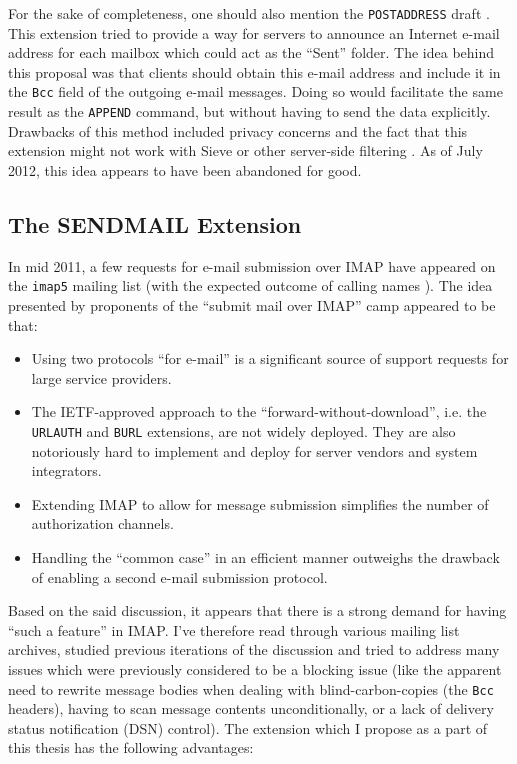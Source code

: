 \documentclass[trojita]{subfiles}
\begin{document}
For the sake of completeness, one should also mention the {\tt POSTADDRESS} draft
\cite{draft-melnikov-imap-postaddress}.  This extension tried to provide a way for servers to announce an Internet
e-mail address for each mailbox which could act as the ``Sent'' folder.  The idea behind this proposal was that clients
should obtain this e-mail address and include it in the {\tt Bcc} field of the outgoing e-mail messages.  Doing so would
facilitate the same result as the {\tt APPEND} command, but without having to send the data explicitly.  Drawbacks of
this method included privacy concerns and the fact that this extension might not work with Sieve or other server-side
filtering \cite{postaddress-sieve}.  As of July 2012, this idea appears to have been abandoned for good.

\subsection{The SENDMAIL Extension}

In mid 2011, a few requests for e-mail submission over IMAP have appeared on the {\tt imap5} mailing list
\cite{brong-imap5-list-of-ideas} (with the expected outcome of calling names \cite{crispin-brong-you-suck-useless}).
The idea presented by proponents of the ``submit mail over IMAP'' camp appeared to be that:

\begin{itemize}
  \item Using two protocols ``for e-mail'' is a significant source of support requests for large service providers.
  \item The IETF-approved approach to the ``forward-without-download'', i.e. the {\tt URLAUTH} and {\tt BURL}
    extensions, are not widely deployed.  They are also notoriously hard to implement and deploy for server vendors and
    system integrators.
  \item Extending IMAP to allow for message submission simplifies the number of authorization channels.
  \item Handling the ``common case'' in an efficient manner outweighs the drawback of enabling a second e-mail
    submission protocol.
\end{itemize}

Based on the said discussion, it appears that there is a strong demand for having ``such a feature'' in IMAP.  I've
therefore read through various mailing list archives, studied previous iterations of the discussion and tried to address
many issues which were previously considered to be a blocking issue (like the apparent need to rewrite message bodies
when dealing with blind-carbon-copies (the {\tt Bcc} headers), having to scan message contents unconditionally, or a
lack of delivery status notification (DSN) control).  The extension which I propose as a part of this thesis has the
following advantages:
\end{document}
